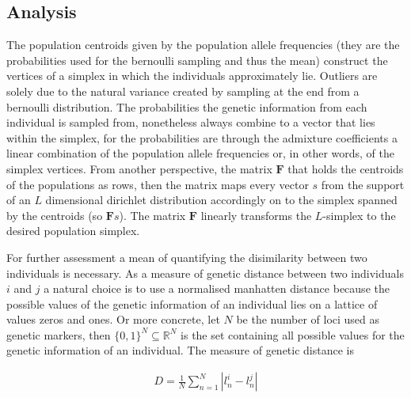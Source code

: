 \documentclass[a4paper, 11pt]{article}
\begin{document}
\subsection{Analysis}
The population centroids given by the population allele frequencies (they are the probabilities used for the bernoulli sampling and thus the mean) construct the vertices of a simplex in which the individuals approximately lie. Outliers are solely due to the natural variance created by sampling at the end from a bernoulli distribution. The probabilities the genetic information from each individual is sampled from, nonetheless always combine to a vector that lies within the simplex, for the probabilities are through the admixture coefficients a linear combination of the population allele frequencies or, in other words, of the simplex vertices. From another perspective, the matrix $\mathbf{F}$ that holds the centroids of the populations as rows, then the matrix maps every vector $s$ from the support of an $L$ dimensional dirichlet distribution accordingly on to the simplex spanned by the centroids (so $\mathbf{F}s$). The matrix $\mathbf{F}$ linearly transforms the $L$-simplex to the desired population simplex.

For further assessment a mean of quantifying the disimilarity between two individuals is necessary. As a measure of genetic distance between two individuals $i$ and $j$ a natural choice is to use a normalised manhatten distance because the possible values of the genetic information of an individual lies on a lattice of values zeros and ones. Or more concrete, let $N$ be the number of loci used as genetic markers, then $\{0,1\}^N \subseteq \mathbb{R}^N$  is the set containing all possible values for the genetic information of an individual. The measure of genetic distance is 

\begin{align*}
D = \frac{1}{N}\sum^{N}_{n = 1} |l^i_n - l^j_n|
\end{align*}
\end{document}

